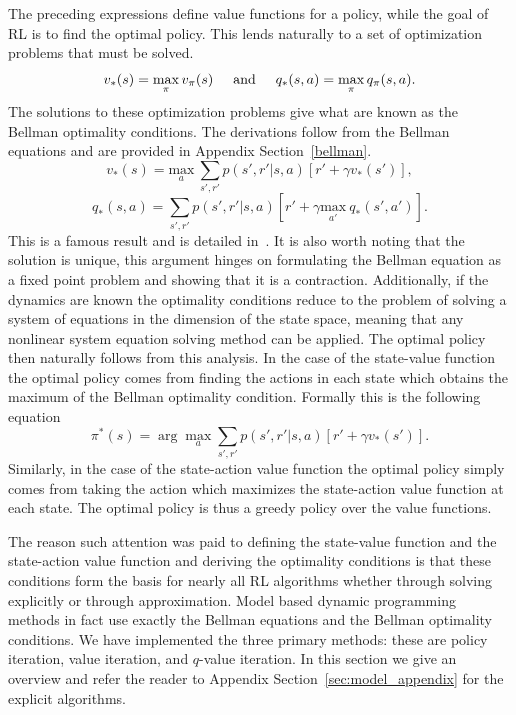 \documentclass{article}
\begin{document}
The preceding expressions define value functions for a policy, while the goal of RL is to find the optimal policy. This lends naturally to a set of optimization problems that must be solved. 
\begin{equation}\label{eq:evaluation}
v_*(s) = \max_\pi v_\pi(s) \hspace{5mm} \text{and} \hspace{5mm} q_*(s, a) = \max_\pi q_\pi(s, a).
\end{equation}
The solutions to these optimization problems give what are known as the Bellman optimality conditions. The derivations follow from the Bellman equations and are provided in Appendix Section~\ref{bellman}.
\begin{equation}\label{eq:v_opt}
v_*(s) = \underset{a}{\text{max}} \ \sum_{s', r'}p(s', r'|s,a)[r' + \gamma v_*(s')], 
\end{equation}
\begin{equation}\label{eq:q_opt}
q_*(s,a) = \sum_{s', r'}p(s', r'|s,a)[r' + \gamma \underset{a'}{\text{max}} \ q_*(s',a')].
\end{equation}
This is a famous result and is detailed in~\cite{bellman2013dynamic}. It is also worth noting that the solution is unique, this argument hinges on formulating the Bellman equation as a fixed point problem and showing that it is a contraction. Additionally, if the dynamics are known the optimality conditions reduce to the problem of solving a system of equations in the dimension of the state space, meaning that any nonlinear system equation solving method can be applied. The optimal policy then naturally follows from this analysis. In the case of the state-value function the optimal policy comes from finding the actions in each state which obtains the maximum of the Bellman optimality condition. Formally this is the following equation
\begin{equation}\label{eq:improvement}
\pi^*(s) = \arg \max_a \sum_{s', r'}p(s', r'|s,a)[r' + \gamma v_*(s')].
\end{equation}
Similarly, in the case of the state-action value function the optimal policy simply comes from taking the action which maximizes the state-action value function at each state. The optimal policy is thus a greedy policy over the value functions.

The reason such attention was paid to defining the state-value function and the state-action value function and deriving the optimality conditions is that these conditions form the basis for nearly all RL algorithms whether through solving explicitly or through approximation. Model based dynamic programming methods in fact use exactly the Bellman equations and the Bellman optimality conditions. We have implemented the three primary methods: these are policy iteration, value iteration, and $q$-value iteration. In this section we give an overview and refer the reader to Appendix Section~\ref{sec:model_appendix} for the explicit algorithms.
\end{document}
